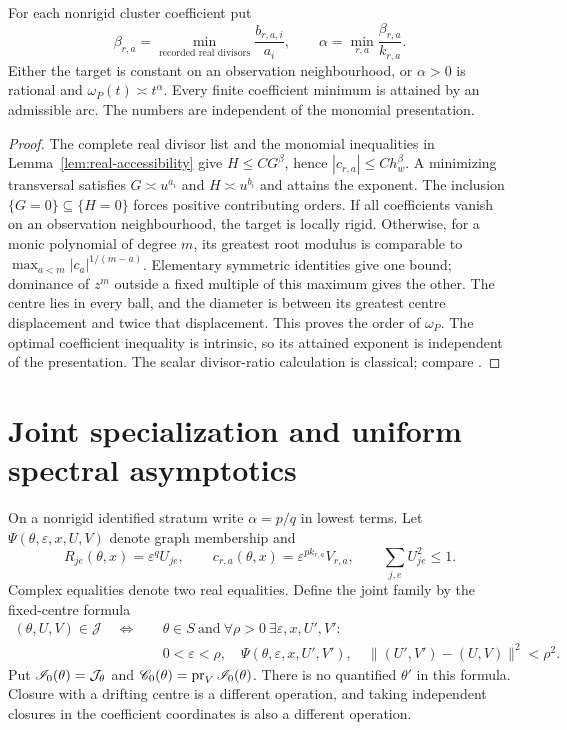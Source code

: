 \begin{corollary}\label{cor:orders}
For each nonrigid cluster coefficient put
\begin{equation}\label{eq:exponent}
 \beta_{r,a}=\min_{\text{recorded real divisors}}\frac{b_{r,a,i}}{a_i},
 \qquad \alpha=\min_{r,a}\frac{\beta_{r,a}}{k_{r,a}}.
\end{equation}
Either the target is constant on an observation neighbourhood, or
$\alpha>0$ is rational and $\omega_P(t)\asymp t^\alpha$.
Every finite coefficient minimum is attained by an admissible arc.
The numbers are independent of the monomial presentation.
\end{corollary}
\begin{proof}
The complete real divisor list and the monomial inequalities in
Lemma~\ref{lem:real-accessibility} give $H\le C G^\beta$, hence
$|c_{r,a}|\le C h_w^\beta$. A minimizing transversal satisfies
$G\asymp u^{a_i}$ and $H\asymp u^{b_i}$ and attains the exponent.
The inclusion $\{G=0\}\subseteq\{H=0\}$ forces positive contributing
orders. If all coefficients vanish on an observation neighbourhood, the
target is locally rigid. Otherwise, for a monic polynomial of degree $m$,
its greatest root modulus is comparable to
$\max_{a<m}|c_a|^{1/(m-a)}$. Elementary symmetric identities give one
bound; dominance of $z^m$ outside a fixed multiple of this maximum gives
the other. The centre lies in every ball, and the diameter is between
its greatest centre displacement and twice that displacement. This
proves the order of $\omega_P$. The optimal coefficient inequality is
intrinsic, so its attained exponent is independent of the presentation.
The scalar divisor-ratio calculation is classical; compare \cite{BE09}.
\end{proof}

\section{Joint specialization and uniform spectral asymptotics}\label{sec:joint}
On a nonrigid identified stratum write $\alpha=p/q$ in lowest terms.
Let $\Psi(\theta,\varepsilon,x,U,V)$ denote graph membership and
\begin{equation}\label{eq:weighted}
 R_{je}(\theta,x)=\varepsilon^q U_{je},\qquad
 c_{r,a}(\theta,x)=\varepsilon^{p k_{r,a}}V_{r,a},\qquad
 \sum_{j,e}U_{je}^2\le1.
\end{equation}
Complex equalities denote two real equalities. Define the joint family
by the fixed-centre formula
\begin{align}
 (\theta,U,V)\in\mathcal J\quad\Longleftrightarrow\quad
 &\theta\in S\ \text{and}\ \forall\rho>0\ \exists\varepsilon,x,U',V':
 \nonumber\\
 &0<\varepsilon<\rho,\quad\Psi(\theta,\varepsilon,x,U',V'),\quad
 \|(U',V')-(U,V)\|^2<\rho^2.\label{eq:closure-formula}
\end{align}
Put $\mathscr I_0(\theta)=\mathcal J_\theta$ and
$\mathscr C_0(\theta)=\operatorname{pr}_V\mathscr I_0(\theta)$. There is no quantified
$\theta'$ in this formula. Closure with a drifting centre is a different
operation, and taking independent closures in the coefficient coordinates
is also a different operation.

